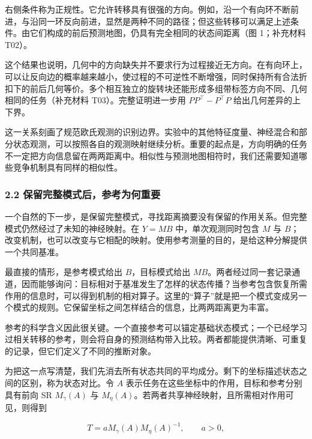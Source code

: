 \documentclass[11pt,a4paper]{article}
\begin{document}
右侧条件称为正规性。它允许转移具有很强的方向。例如，沿一个有向环不断前进，与沿同一环反向前进，显然是两种不同的路径；但这些转移可以满足上述条件。由它们构成的前后预测地图，仍具有完全相同的状态间距离（图
1；补充材料 T02）。

这个结果也说明，几何中的方向缺失并不要求行为过程接近无方向。在有向环上，可以让反向边的概率越来越小，使过程的不可逆性不断增强，同时保持所有合法折扣下的前后几何等价。多个相互独立的旋转块还能形成多组带标签方向不同、几何相同的任务（补充材料
T03）。完整证明进一步用 \(PP^\top-P^\top P\) 给出几何差异的上下界。

这一关系刻画了规范欧氏观测的识别边界。实验中的其他特征度量、神经混合和部分状态观测，可以按照各自的观测映射继续分析。重要的起点是，方向明确的任务不一定把方向信息留在两两距离中。相似性与预测地图相符时，我们还需要知道哪些竞争机制具有同样的相似性。

\subsubsection{2.2
保留完整模式后，参考为何重要}\label{ux4fddux7559ux5b8cux6574ux6a21ux5f0fux540eux53c2ux8003ux4e3aux4f55ux91cdux8981}

一个自然的下一步，是保留完整模式，寻找距离摘要没有保留的作用关系。但完整模式仍然经过了未知的神经映射。在
\(Y=MB\) 中，单次观测同时包含 \(M\) 与
\(B\)；改变机制，也可以改变与它相配的映射。使用参考测量的目的，是给这种分解提供一个共同基准。

最直接的情形，是参考模式给出 \(B\)，目标模式给出
\(MB\)。两者经过同一套记录通道，因而能够询问：目标相对于基准发生了怎样的状态传播？当参考包含恢复所需作用的信息时，可以得到机制的相对算子。这里的“算子”就是把一个模式变成另一个模式的规则。它保留坐标之间怎样结合的信息，比两两距离更为丰富。

参考的科学含义因此很关键。一个直接参考可以锚定基础状态模式；一个已经学习过相关转移的参考，则会将自身的预测结构带入比较。两者都能提供清晰、可重复的记录，但它们定义了不同的推断对象。

\par
\noindent\begin{minipage}{\linewidth}

为把这一点写清楚，我们先消去所有状态共同的平均成分。剩下的坐标描述状态之间的区别，称为状态对比。令
\(A\) 表示任务在这些坐标中的作用，目标和参考分别具有前向 SR
\(M_\gamma(A)\) 与
\(M_\eta(A)\)。若两者共享神经映射，且所需相对作用可见，则得到

\[
T=aM_\gamma(A)M_\eta(A)^{-1},\qquad a>0,
\]

\end{minipage}\par
\end{document}
